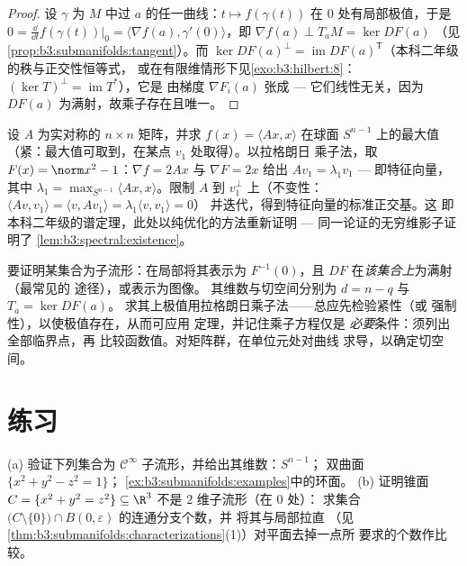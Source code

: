 \begin{proof}
设 $\gamma$ 为 $M$ 中过 $a$ 的任一曲线：$t \mapsto
f(\gamma(t))$ 在 $0$ 处有局部极值，于是 $0 =
\frac{\dd}{\dd t}f(\gamma(t))\big|_0 = \langle\nabla f(a),
\gamma'(0)\rangle$，即 $\nabla f(a) \perp T_aM = \ker DF(a)$
（见\cref{prop:b3:submanifolds:tangent}）。而 $\ker DF(a)^\perp
= \operatorname{im}DF(a)^{\mathsf T}$（本科二年级的秩与正交性恒等式，
或在有限维情形下见\cref{exo:b3:hilbert:8}：
$(\ker T)^\perp = \operatorname{im}T^*$），它是
由梯度 $\nabla F_i(a)$ 张成 --- 它们线性无关，因为
$DF(a)$ 为满射，故乘子存在且唯一。
\end{proof}

\begin{example}[从几何角度看谱定理]
\label{ex:b3:submanifolds:rayleigh}
设 $A$ 为实对称的 $n\times n$ 矩阵，并求
$f(x) = \langle Ax, x\rangle$ 在球面 $S^{n-1}$ 上的最大值
（紧：最大值可取到，在某点 $v_1$ 处取得）。以拉格朗日
乘子法，取 $F(x) = \norm x^2 - 1$：$\nabla f = 2Ax$ 与 $\nabla F =
2x$ 给出 $Av_1 = \lambda_1v_1$ --- 即特征向量，其中
$\lambda_1 = \max_{S^{n-1}}\langle Ax, x\rangle$。限制
$A$ 到 $v_1^\perp$ 上（不变性：$\langle Av, v_1\rangle =
\langle v, Av_1\rangle = \lambda_1\langle v, v_1\rangle = 0$）
并迭代，得到特征向量的标准正交基。这
即本科二年级的谱定理，此处以纯优化的方法重新证明
--- 同一论证的无穷维影子证明了
\cref{lem:b3:spectral:existence}。
\end{example}

\begin{method}\label{met:b3:submanifolds:method}
要证明某集合为子流形：在局部将其表示为
$F^{-1}(0)$，且 $DF$ 在\emph{该集合上}为满射（最常见的
途径），或表示为图像。
其维数与切空间分别为 $d = n - q$ 与 $T_a = \ker DF(a)$。
求其上极值用拉格朗日乘子法——总应先检验紧性（或
强制性），以使极值存在，从而可应用
定理，并记住乘子方程仅是
\emph{必要}条件：须列出全部临界点，再
比较函数值。对矩阵群，在单位元处对曲线
求导，以确定切空间。
\end{method}

\section{练习}

\begin{exercise}[$\star$]\label{exo:b3:submanifolds:1}
(a) 验证下列集合为 $\mathcal C^\infty$
子流形，并给出其维数：$S^{n-1}$；
双曲面 $\{x^2 + y^2 - z^2 = 1\}$；
\cref{ex:b3:submanifolds:examples}中的环面。
(b) 证明锥面 $C = \{x^2 + y^2 = z^2\} \subseteq
\R^3$ 不是 $2$ 维子流形（在 $0$ 处）：
求集合
$\bigl(C\setminus\{0\}\bigr)\cap B(0,\varepsilon)$ 的连通分支个数，并
将其与局部拉直
（见\cref{thm:b3:submanifolds:characterizations}(1)）对平面去掉一点所
要求的个数作比较。
\end{exercise}

